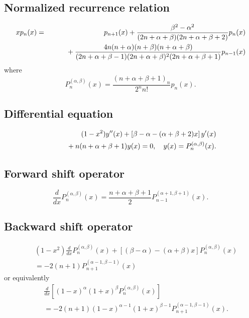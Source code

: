 \documentclass[envcountchap,graybox]{svmono}
\newcommand{\mathindent}{\hspace{7.5mm}}
\begin{document}
\subsection*{Normalized recurrence relation}
\begin{eqnarray}
\label{NormRecJacobi}
xp_n(x)&=&p_{n+1}(x)+\frac{\beta^2-\alpha^2}{(2n+\alpha+\beta)(2n+\alpha+\beta+2)}p_n(x)\nonumber\\
& &{}\mathindent{}+\frac{4n(n+\alpha)(n+\beta)(n+\alpha+\beta)}
{(2n+\alpha+\beta-1)(2n+\alpha+\beta)^2(2n+\alpha+\beta+1)}p_{n-1}(x)
\end{eqnarray}
where
$$P_n^{(\alpha,\beta)}(x)=\frac{(n+\alpha+\beta+1)_n}{2^nn!}p_n(x).$$

\subsection*{Differential equation}
\begin{eqnarray}
\label{dvJacobi}
& &(1-x^2)y''(x)+\left[\beta-\alpha-(\alpha+\beta+2)x\right]y'(x)\nonumber\\
& &{}\mathindent{}+n(n+\alpha+\beta+1)y(x)=0,\quad y(x)=P_n^{(\alpha,\beta)}(x).
\end{eqnarray}

\subsection*{Forward shift operator}
\begin{equation}
\label{shift1Jacobi}
\frac{d}{dx}P_n^{(\alpha,\beta)}(x)=\frac{n+\alpha+\beta+1}{2}P_{n-1}^{(\alpha+1,\beta+1)}(x).
\end{equation}

\subsection*{Backward shift operator}
\begin{eqnarray}
\label{shift2JacobiI}
& &(1-x^2)\frac{d}{dx}P_n^{(\alpha,\beta)}(x)+
\left[(\beta-\alpha)-(\alpha+\beta)x\right]P_n^{(\alpha,\beta)}(x)\nonumber\\
& &{}=-2(n+1)P_{n+1}^{(\alpha-1,\beta-1)}(x)
\end{eqnarray}
or equivalently
\begin{eqnarray}
\label{shift2JacobiII}
& &\frac{d}{dx}\left[(1-x)^\alpha(1+x)^\beta P_n^{(\alpha,\beta)}(x)\right]\nonumber\\
& &{}=-2(n+1)(1-x)^{\alpha-1}(1+x)^{\beta-1}P_{n+1}^{(\alpha-1,\beta-1)}(x).
\end{eqnarray}
\end{document}
